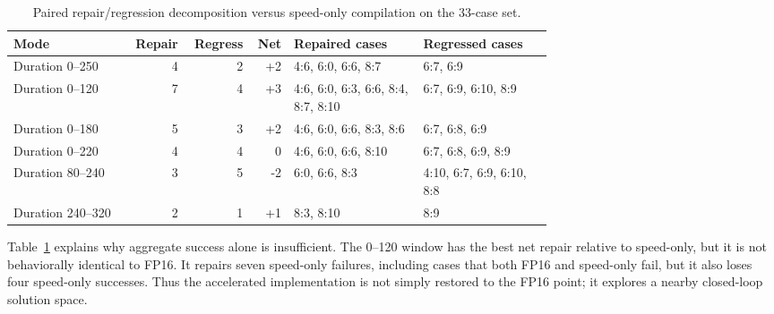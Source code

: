 \documentclass[10pt]{article}
\begin{document}
\begin{table}[H]
\centering
\scriptsize
\setlength{\tabcolsep}{2.5pt}
\caption{Paired repair/regression decomposition versus speed-only compilation on the 33-case set.}
\label{tab:phase29-repair-regress}
\begin{tabular}{p{0.22\linewidth}rrrp{0.24\linewidth}p{0.24\linewidth}}
\toprule
Mode & Repair & Regress & Net & Repaired cases & Regressed cases \\
\midrule
Duration 0--250 & 4 & 2 & +2 & 4:6, 6:0, 6:6, 8:7 & 6:7, 6:9 \\
Duration 0--120 & 7 & 4 & +3 & 4:6, 6:0, 6:3, 6:6, 8:4, 8:7, 8:10 & 6:7, 6:9, 6:10, 8:9 \\
Duration 0--180 & 5 & 3 & +2 & 4:6, 6:0, 6:6, 8:3, 8:6 & 6:7, 6:8, 6:9 \\
Duration 0--220 & 4 & 4 & 0 & 4:6, 6:0, 6:6, 8:10 & 6:7, 6:8, 6:9, 8:9 \\
Duration 80--240 & 3 & 5 & -2 & 6:0, 6:6, 8:3 & 4:10, 6:7, 6:9, 6:10, 8:8 \\
Duration 240--320 & 2 & 1 & +1 & 8:3, 8:10 & 8:9 \\
\bottomrule
\end{tabular}
\end{table}

Table~\ref{tab:phase29-repair-regress} explains why aggregate success alone is insufficient. The 0--120 window has the best net repair relative to speed-only, but it is not behaviorally identical to FP16. It repairs seven speed-only failures, including cases that both FP16 and speed-only fail, but it also loses four speed-only successes. Thus the accelerated implementation is not simply restored to the FP16 point; it explores a nearby closed-loop solution space.
\end{document}
